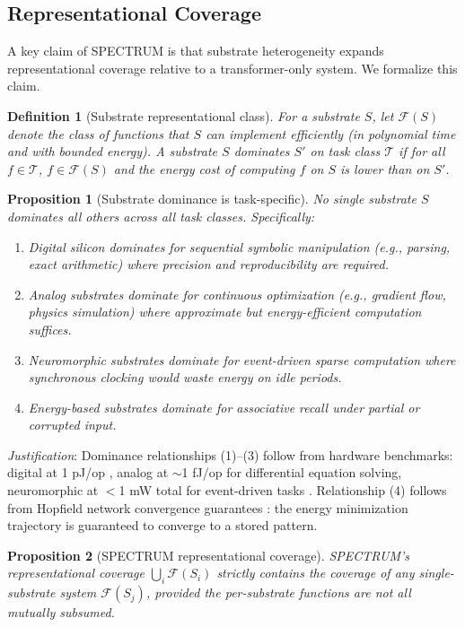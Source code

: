 \documentclass[12pt]{article}
\newtheorem{definition}{Definition}
\newtheorem{proposition}{Proposition}
\begin{document}
\subsection{Representational Coverage}

A key claim of SPECTRUM is that substrate heterogeneity expands representational coverage relative to a transformer-only system. We formalize this claim.

\begin{definition}[Substrate representational class]
For a substrate $S$, let $\mathcal{F}(S)$ denote the class of functions that $S$ can implement efficiently (in polynomial time and with bounded energy). A substrate $S$ dominates $S'$ on task class $\mathcal{T}$ if for all $f \in \mathcal{T}$, $f \in \mathcal{F}(S)$ and the energy cost of computing $f$ on $S$ is lower than on $S'$.
\end{definition}

\begin{proposition}[Substrate dominance is task-specific]
No single substrate $S$ dominates all others across all task classes. Specifically:
\begin{enumerate}
    \item Digital silicon dominates for sequential symbolic manipulation (e.g., parsing, exact arithmetic) where precision and reproducibility are required.
    \item Analog substrates dominate for continuous optimization (e.g., gradient flow, physics simulation) where approximate but energy-efficient computation suffices.
    \item Neuromorphic substrates dominate for event-driven sparse computation where synchronous clocking would waste energy on idle periods.
    \item Energy-based substrates dominate for associative recall under partial or corrupted input.
\end{enumerate}
\end{proposition}

\textit{Justification}: Dominance relationships (1)--(3) follow from hardware benchmarks: digital at 1 pJ/op \cite{sarpeshkar2010}, analog at $\sim$1 fJ/op for differential equation solving, neuromorphic at $<$1 mW total for event-driven tasks \cite{davies2021}. Relationship (4) follows from Hopfield network convergence guarantees \cite{hopfield1982}: the energy minimization trajectory is guaranteed to converge to a stored pattern.

\begin{proposition}[SPECTRUM representational coverage]
SPECTRUM's representational coverage $\bigcup_i \mathcal{F}(S_i)$ strictly contains the coverage of any single-substrate system $\mathcal{F}(S_j)$, provided the per-substrate functions are not all mutually subsumed.
\end{proposition}
\end{document}
